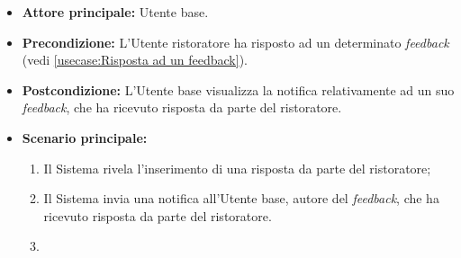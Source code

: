 \label{usecase:Visualizza notifica risposta feedback}
\begin{itemize}
	\item \textbf{Attore principale:} Utente base.
	
	\item \textbf{Precondizione:} L'Utente ristoratore ha risposto ad un determinato \textit{feedback} (vedi \autoref{usecase:Risposta ad un feedback}).

    
	\item \textbf{Postcondizione:} L'Utente base visualizza la notifica relativamente ad un suo \textit{feedback}, che ha ricevuto risposta da parte del ristoratore.
     
	\item \textbf{Scenario principale:}
	      \begin{enumerate}
                \item Il Sistema rivela l'inserimento di una risposta da parte del ristoratore;
                \item Il Sistema invia una notifica all'Utente base, autore del \textit{feedback}, che ha ricevuto risposta da parte del ristoratore.
                \item 
	      \end{enumerate}
\end{itemize}